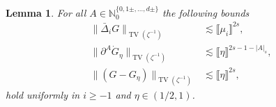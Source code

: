 \documentclass{article}
\numberwithin{equation}{section}
\theoremstyle{plain}
\newtheorem{lemma}[theorem]{Lemma}
\theoremstyle{definition}
\begin{document}
\begin{lemma}
  \label{lem:estimates-for-G}For all $A \in \mathbb{N}_0^{\{ 0, 1 \pm, \ldots,
  d \pm \}}$ the following bounds
  \begin{align*}
     \| \bar{\Delta}_i  G \|_{\operatorname{TV} (\zeta^{- 1})}
     &\lesssim \llbracket \mu_i \rrbracket_{}^{2 s},\\
     \| \partial^A \dot{G}_{\eta} \|_{\operatorname{TV} (\zeta^{- 1})}
     &\lesssim \llbracket \eta \rrbracket^{2 s - 1 - | A |_s},\\
     \| (G - G_{\eta}) \|_{\operatorname{TV} (\zeta^{- 1})}
     &\lesssim \llbracket \eta \rrbracket^{2 s},
  \end{align*}
  hold uniformly in $i \geqslant - 1$ and $\eta \in (1 / 2, 1)$.
\end{lemma}
\end{document}
